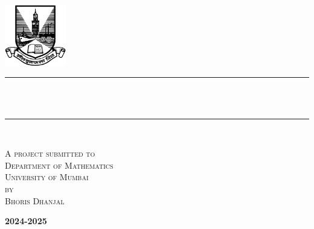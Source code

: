 \begin{titlepage}
	\newcommand{\HRule}{\rule{\linewidth}{0.5mm}} %
	
	
	
	
	\center %
	
	\begin{center}
		
		
		
		
		\includegraphics[width=0.2\textwidth]{Images/uom.png}\\[1.5cm]
		\HRule \\[0.4cm]
		{ \huge \textsc \reporttitle}\\[0.4cm] %
		\HRule \\[2.5cm]
	\end{center}
	\textsc{
		\large A project submitted to\\
		\large Department of Mathematics\\
		\large University of Mumbai\\
		\large by\\[1cm]
		\large Bhoris Dhanjal}
	
	\vfill %
	\textbf{
		2024-2025}
			\newpage
		\ 
		\newpage
\end{titlepage}
